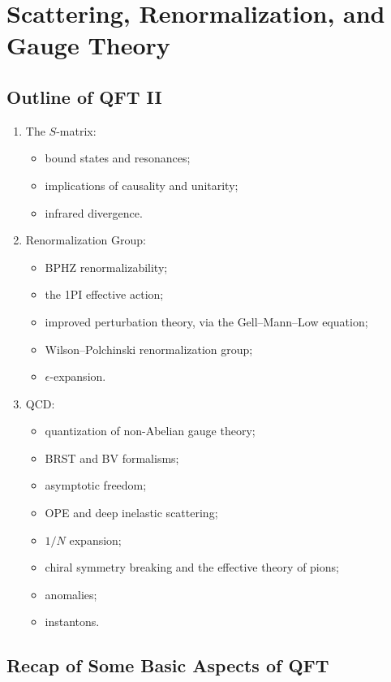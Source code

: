 \chapter{Scattering, Renormalization, and Gauge Theory}

\section{Outline of QFT II}

\begin{enumerate}
\item The \(S\)-matrix:
\begin{itemize}
  \item bound states and resonances;
  \item implications of causality and unitarity;
  \item infrared divergence.
\end{itemize}

\item Renormalization Group:
\begin{itemize}
  \item BPHZ renormalizability;
  \item the 1PI effective action;
  \item improved perturbation theory, via the Gell--Mann--Low equation;
  \item Wilson--Polchinski renormalization group;
  \item \(\epsilon\)-expansion.
\end{itemize}

\item QCD:
\begin{itemize}
  \item quantization of non-Abelian gauge theory;
  \item BRST and BV formalisms;
  \item asymptotic freedom;
  \item OPE and deep inelastic scattering;
  \item \(1/N\) expansion;
  \item chiral symmetry breaking and the effective theory of pions;
  \item anomalies;
  \item instantons.
\end{itemize}
\end{enumerate}

\section{Recap of Some Basic Aspects of QFT}

